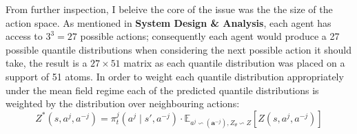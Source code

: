 From further inspection, I beleive the core of the issue 
was the the size of the action space. As mentioned in \textbf{System Design \& Analysis},
each agent has access to $3^3 = 27$ possible actions; consequently
each agent would produce a 27 possible quantile distributions
when considering the next possible action it should take, the result is a $27 \times 51$ matrix
as each quantile distribution was placed on a support of 51 atoms.
In order to weight each quantile distribution appropriately
under the mean field regime each of the predicted quantile
distributions is weighted by the distribution over
neighbouring actions:
\begin{equation}
    Z^*(s,a^j, a^{-j}) = \pi^j_t(a^j \mid s',a^{-j}) \cdot \mathbb{E}_{a^j \backsim(\mathbf{a}^{-j}), Z_\theta \backsim Z}[\hat{Z}(s,a^j, a^{-j})]
\end{equation}

